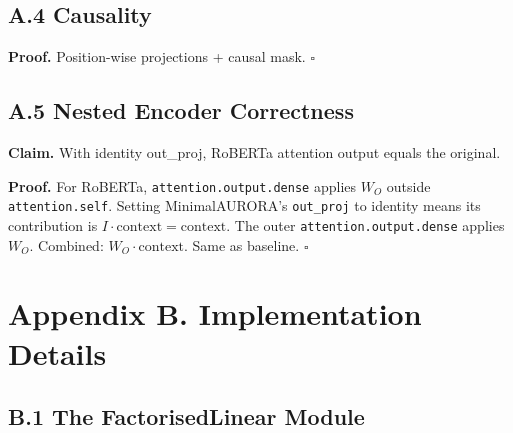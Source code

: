 \subsection{A.4 Causality}

\textbf{Proof.} Position-wise projections + causal mask. $\square$

\subsection{A.5 Nested Encoder Correctness}

\textbf{Claim.} With identity out\_proj, RoBERTa attention output equals the 
original.

\textbf{Proof.} For RoBERTa, \texttt{attention.output.dense} applies $W_O$ outside 
\texttt{attention.self}. Setting MinimalAURORA's \texttt{out\_proj} to identity means 
its contribution is $I \cdot \text{context} = \text{context}$. The outer 
\texttt{attention.output.dense} applies $W_O$. Combined: $W_O \cdot \text{context}$. 
Same as baseline. $\square$



\section{Appendix B. Implementation Details}

\subsection{B.1 The FactorisedLinear Module}

